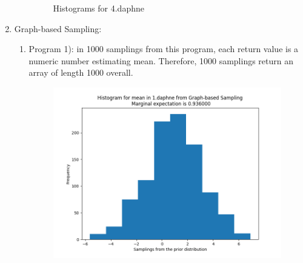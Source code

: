 \documentclass{article}
\begin{document}
\begin{enumerate}
\begin{enumerate}
\begin{figure}[!htp]
	\centering
    \hfill%
        \caption{Histograms for 4.daphne}
\end{figure}
\end{enumerate}
\newpage
\item Graph-based Sampling:
\begin{enumerate}
\item Program 1): in 1000 samplings from this program,  each return value is a numeric number estimating mean. Therefore, 1000 samplings return an array of length 1000 overall.
\begin{figure}[!htp]
	\centering
	\includegraphics[scale=0.4]{../figs/graph_1.png}

\end{figure}
\end{enumerate}
\end{enumerate}
\end{document}
